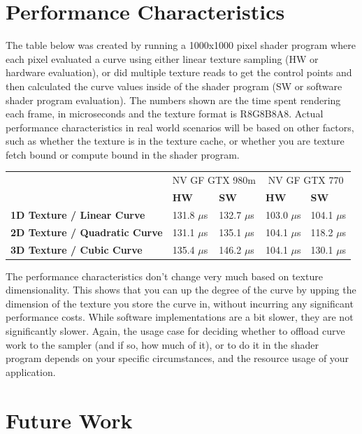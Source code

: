 \documentclass{jcgt}
\begin{document}
\section{Performance Characteristics}
\label{sec:performancecharacteristics}

The table below was created by running a 1000x1000 pixel shader program where each pixel evaluated a curve using either linear texture sampling (HW or hardware evaluation), or did multiple texture reads to get the control points and then calculated the curve values inside of the shader program (SW or software shader program evaluation).  The numbers shown are the time spent rendering each frame, in microseconds and the texture format is R8G8B8A8.  Actual performance characteristics in real world scenarios will be based on other factors, such as whether the texture is in the texture cache, or whether you are texture fetch bound or compute bound in the shader program.

\begin{tabular}{|l|l l|l l|}
\hline
& \multicolumn{2}{|c|}{NV GF GTX 980m} & \multicolumn{2}{|c|}{NV GF GTX 770}\\
& \bf{HW} & \bf{SW} & \bf{HW} & \bf{SW} \\ \hline
\bf{1D Texture / Linear Curve} & 131.8 $\mu$s & 132.7 $\mu$s & 103.0 $\mu$s & 104.1 $\mu$s \\ \hline
\bf{2D Texture / Quadratic Curve} & 131.1 $\mu$s & 135.1 $\mu$s & 104.1 $\mu$s & 118.2 $\mu$s \\ \hline
\bf{3D Texture / Cubic Curve} & 135.4 $\mu$s & 146.2 $\mu$s & 104.1 $\mu$s & 130.1 $\mu$s \\ \hline
\end{tabular}

The performance characteristics don't change very much based on texture dimensionality. This shows that you can up the degree of the curve by upping the dimension of the texture you store the curve in, without incurring any significant performance costs.  While software implementations are a bit slower, they are not significantly slower.  Again, the usage case for deciding whether to offload curve work to the sampler (and if so, how much of it), or to do it in the shader program depends on your specific circumstances, and the resource usage of your application.

\section*{Future Work}
\label{sec:futurework}
\end{document}
